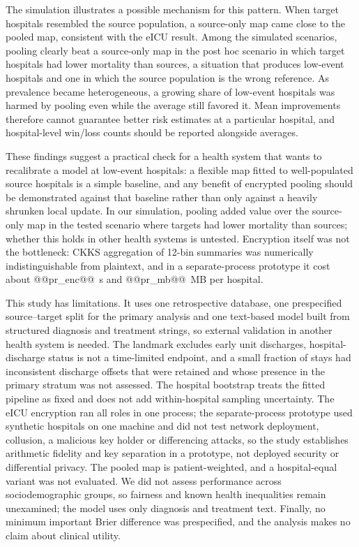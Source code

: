 \documentclass[11pt]{article}
\begin{document}
The simulation illustrates a possible mechanism for this pattern. When target hospitals resembled the source population, a source-only map came close to the pooled map, consistent with the eICU result. Among the simulated scenarios, pooling clearly beat a source-only map in the post hoc scenario in which target hospitals had lower mortality than sources, a situation that produces low-event hospitals and one in which the source population is the wrong reference. As prevalence became heterogeneous, a growing share of low-event hospitals was harmed by pooling even while the average still favored it. Mean improvements therefore cannot guarantee better risk estimates at a particular hospital, and hospital-level win/loss counts should be reported alongside averages.

These findings suggest a practical check for a health system that wants to recalibrate a model at low-event hospitals: a flexible map fitted to well-populated source hospitals is a simple baseline, and any benefit of encrypted pooling should be demonstrated against that baseline rather than only against a heavily shrunken local update. In our simulation, pooling added value over the source-only map in the tested scenario where targets had lower mortality than sources; whether this holds in other health systems is untested. Encryption itself was not the bottleneck: CKKS aggregation of 12-bin summaries was numerically indistinguishable from plaintext, and in a separate-process prototype it cost about @@pr_enc@@~s and @@pr_mb@@~MB per hospital.

This study has limitations. It uses one retrospective database, one prespecified source--target split for the primary analysis and one text-based model built from structured diagnosis and treatment strings, so external validation in another health system is needed. The landmark excludes early unit discharges, hospital-discharge status is not a time-limited endpoint, and a small fraction of stays had inconsistent discharge offsets that were retained and whose presence in the primary stratum was not assessed. The hospital bootstrap treats the fitted pipeline as fixed and does not add within-hospital sampling uncertainty. The eICU encryption ran all roles in one process; the separate-process prototype used synthetic hospitals on one machine and did not test network deployment, collusion, a malicious key holder or differencing attacks, so the study establishes arithmetic fidelity and key separation in a prototype, not deployed security or differential privacy. The pooled map is patient-weighted, and a hospital-equal variant was not evaluated. We did not assess performance across sociodemographic groups, so fairness and known health inequalities remain unexamined; the model uses only diagnosis and treatment text. Finally, no minimum important Brier difference was prespecified, and the analysis makes no claim about clinical utility.
\end{document}
